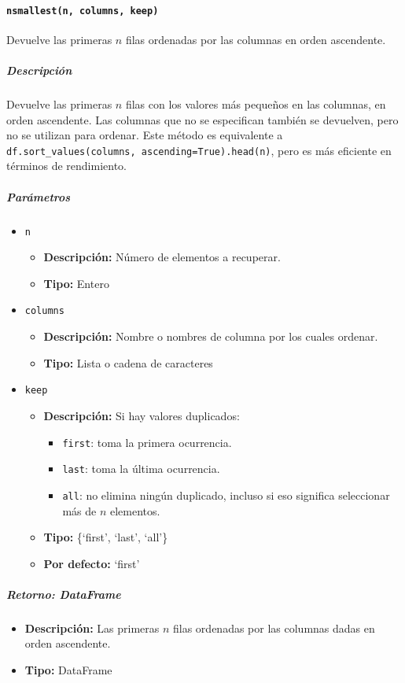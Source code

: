 \paragraph{\texttt{nsmallest(n, columns, keep)}} Devuelve las primeras \( n \) filas ordenadas por las columnas en orden ascendente.
\subparagraph{\textbf{Descripción}}
Devuelve las primeras \( n \) filas con los valores más pequeños en las columnas, en orden ascendente. Las columnas que no se especifican también se devuelven, pero no se utilizan para ordenar.
Este método es equivalente a \texttt{df.sort\_values(columns, ascending=True).head(n)}, pero es más eficiente en términos de rendimiento.
\subparagraph{\textbf{Parámetros}}
\begin{itemize}
\item \texttt{n}
\begin{itemize}
\item \textbf{Descripción:} Número de elementos a recuperar.
\item \textbf{Tipo:} Entero
\end{itemize}
\item \texttt{columns}
\begin{itemize}
\item \textbf{Descripción:} Nombre o nombres de columna por los cuales ordenar.
\item \textbf{Tipo:} Lista o cadena de caracteres
\end{itemize}
\item \texttt{keep}
\begin{itemize}
\item \textbf{Descripción:} Si hay valores duplicados:
\begin{itemize}
\item \texttt{first}: toma la primera ocurrencia.
\item \texttt{last}: toma la última ocurrencia.
\item \texttt{all}: no elimina ningún duplicado, incluso si eso significa seleccionar más de \( n \) elementos.
\end{itemize}
\item \textbf{Tipo:} \{`first', `last', `all'\}
\item \textbf{Por defecto:} `first'
\end{itemize}
\end{itemize}
\subparagraph{\textbf{Retorno:} DataFrame}
\begin{itemize}
\item \textbf{Descripción:} Las primeras \( n \) filas ordenadas por las columnas dadas en orden ascendente.
\item \textbf{Tipo:} DataFrame
\end{itemize}
